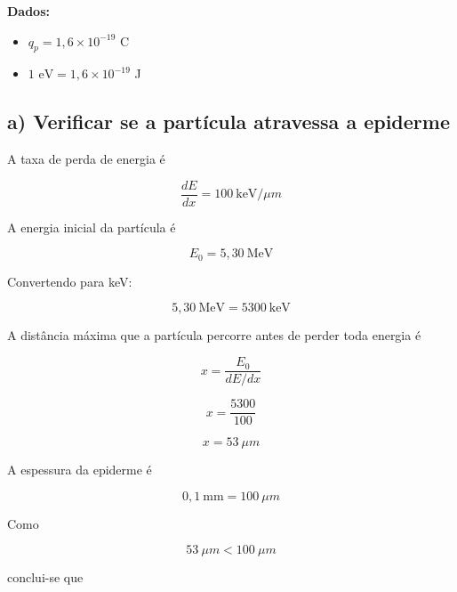 \documentclass[a4paper,12pt]{article}
\begin{document}
\textbf{Dados:}

\begin{itemize}
\item $q_p = 1{,}6 \times 10^{-19}$ C
\item $1 \text{ eV} = 1{,}6 \times 10^{-19}$ J
\end{itemize}

\hrulefill

\subsection*{a) Verificar se a partícula atravessa a epiderme}

A taxa de perda de energia é

\begin{equation}
\frac{dE}{dx} = 100 \ \text{keV}/\mu m
\end{equation}

A energia inicial da partícula é

\begin{equation}
E_0 = 5{,}30 \ \text{MeV}
\end{equation}

Convertendo para keV:

\begin{equation}
5{,}30 \ \text{MeV} = 5300 \ \text{keV}
\end{equation}

A distância máxima que a partícula percorre antes de perder toda energia é

\begin{equation}
x = \frac{E_0}{dE/dx}
\end{equation}

\begin{equation}
x = \frac{5300}{100}
\end{equation}

\begin{equation}
x = 53 \ \mu m
\end{equation}

A espessura da epiderme é

\begin{equation}
0{,}1 \ \text{mm} = 100 \ \mu m
\end{equation}

Como

\begin{equation}
53 \ \mu m < 100 \ \mu m
\end{equation}

conclui-se que
\end{document}
